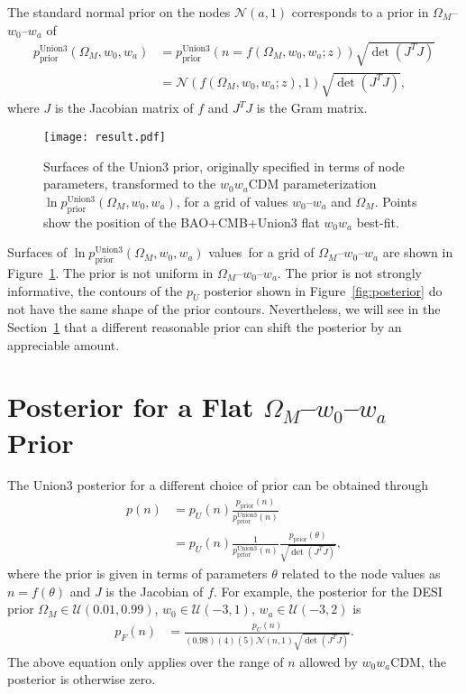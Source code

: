 \documentclass{aastex631}
\begin{document}
The standard normal prior on the nodes $\mathcal{N}(a,1)$ corresponds to a prior in  $\Omega_M$--$w_0$--$w_a$ of
\begin{align}
p^\text{Union3}_\text{prior}(\Omega_M, w_0,w_a)  & =p^\text{Union3}_\text{prior}(n=f(\Omega_M, w_0, w_a; z))  \sqrt{\det{\left(J^T J\right)}} \\
& = \mathcal{N}(f(\Omega_M, w_0, w_a; z),1)  \sqrt{\det{\left(J^T J\right)}}, \label{eq:Union3prior}
\end{align}
where $J$ is the Jacobian matrix of $f$ and $J^TJ$ is the Gram matrix.

\begin{figure}[htbp] %
   \centering
   \texttt{[image: result.pdf]} 
   \caption{Surfaces of the Union3 prior, originally specified in terms of node parameters, transformed to the $w_0w_a$CDM parameterization
   $\ln{p^\text{Union3}_\text{prior}}(\Omega_M, w_0,w_a)$,  for a grid of values
 $w_0$--$w_a$ and $\Omega_M$.   
   Points show the position of the BAO+CMB+Union3 flat $w_0w_a$ best-fit.}
   \label{fig:priors}
\end{figure}

Surfaces of  $\ln{p^\text{Union3}_\text{prior}}(\Omega_M, w_0,w_a)$ values\ for a grid of $\Omega_M$--$w_0$--$w_a$ are shown in
Figure~\ref{fig:priors}.   The prior is not uniform in  $\Omega_M$--$w_0$--$w_a$.
The prior is not strongly informative, the contours of the $p_U$
posterior shown in Figure~\ref{fig:posterior} do not have the same shape of the prior contours.  Nevertheless,
we will see in the  Section~\ref{sec:flatposterior} that a different reasonable prior can shift the posterior
by an appreciable amount.

\section{Posterior for a Flat  $\Omega_M$--$w_0$--$w_a$  Prior}
\label{sec:flatposterior}
The Union3  posterior for a different choice of prior can be obtained through
\begin{align}
p(n) & = p_U(n)\frac{p_\text{prior}(n)}{p^\text{Union3}_\text{prior}(n)}\\
 & = p_U(n) \frac{1}{p^\text{Union3}_\text{prior}(n) } \frac{p_\text{prior}(\theta)}{ \sqrt{\det{\left(J^T J\right)}}} ,
\end{align}
where the prior is given in terms of parameters $\theta$
related to the node values as $n=f(\theta)$ and $J$ is the Jacobian of $f$.
For example, 
the posterior for the 
DESI prior $\Omega_M \in \mathcal{U}(0.01,0.99)$, $w_0 \in \mathcal{U}(-3,1)$, $w_a \in \mathcal{U}(-3,2)$
is
\begin{align}
p_F(n) 
& = \frac{p_U(n)}{(0.98)(4)(5) \mathcal{N}(n,1)  \sqrt{\det{\left(J^T J\right)}}}.
\label{eq:flatprior}
\end{align}
The above equation only applies over the range of $n$ allowed by  $w_0w_a$CDM, the posterior is otherwise zero.
\end{document}
